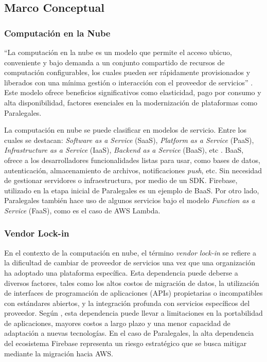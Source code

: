 \subsection{Marco Conceptual}

\subsubsection{Computación en la Nube}

``La computación en la nube es un modelo que permite el acceso ubicuo, conveniente y bajo demanda a un conjunto compartido de recursos de computación configurables, los cuales pueden ser rápidamente provisionados y liberados con una mínima gestión o interacción con el proveedor de servicios'' \cite{Mell2011}. Este modelo ofrece beneficios significativos como elasticidad, pago por consumo y alta disponibilidad, factores esenciales en la modernización de plataformas como Paralegales.

La computación en nube se puede clasificar en modelos de servicio. Entre los cuales se destacan: \textit{Software as a Service} (SaaS), \textit{Platform as a Service} (PaaS), \textit{Infrastructure as a Service} (IaaS), \textit{Backend as a Service} (BaaS), etc \cite{Mell2011}. BaaS, ofrece a los desarrolladores funcionalidades listas para usar, como bases de datos, autenticación, almacenamiento de archivos, notificaciones \textit{push}, etc. Sin necesidad de gestionar servidores o infraestructura, por medio de un SDK. Firebase, utilizado en la etapa inicial de Paralegales es un ejemplo de BaaS. Por otro lado, Paralegales también hace uso de algunos servicios bajo el modelo \textit{Function as a Service} (FaaS), como es el caso de AWS Lambda.

\subsubsection{Vendor Lock-in}

En el contexto de la computación en nube, el término \textit{vendor lock-in} se refiere a la dificultad de cambiar de proveedor de servicios una vez que una organización ha adoptado una plataforma específica.  Esta dependencia puede deberse a diversos factores, tales como los altos costos de migración de datos, la utilización de interfaces de programación de aplicaciones (APIs) propietarias o incompatibles con estándares abiertos, y la integración profunda con servicios específicos del proveedor. Según \textcite{OparaMartins2016}, esta dependencia puede llevar a limitaciones en la portabilidad de aplicaciones, mayores costos a largo plazo y una menor capacidad de adaptación a nuevas tecnologías. En el caso de Paralegales, la alta dependencia del ecosistema Firebase representa un riesgo estratégico que se busca mitigar mediante la migración hacia AWS.

